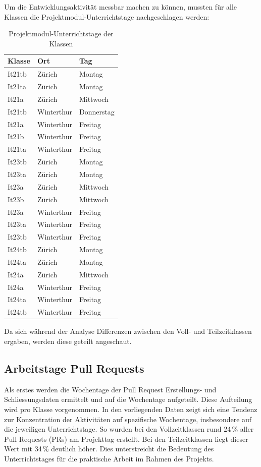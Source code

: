Um die Entwicklungsaktivität messbar machen zu können, mussten für alle Klassen die Projektmodul-Unterrichtstage nachgeschlagen werden:
\begin{table}[ht]
\caption{Projektmodul-Unterrichtstage der Klassen}
\label{tab:stundenplan}
\centering
\begin{tabular}{l l l}
\toprule
\textbf{Klasse} & \textbf{Ort} & \textbf{Tag} \\
\midrule
It21tb   & Zürich      & Montag      \\
It21ta   & Zürich      & Montag      \\
It21a    & Zürich      & Mittwoch    \\
It21tb   & Winterthur  & Donnerstag  \\
It21a    & Winterthur  & Freitag     \\
It21b    & Winterthur  & Freitag     \\
It21ta   & Winterthur  & Freitag     \\
\midrule
It23tb   & Zürich      & Montag      \\
It23ta   & Zürich      & Montag      \\
It23a    & Zürich      & Mittwoch    \\
It23b    & Zürich      & Mittwoch    \\
It23a    & Winterthur  & Freitag     \\
It23ta   & Winterthur  & Freitag     \\
It23tb   & Winterthur  & Freitag     \\
\midrule
It24tb   & Zürich      & Montag      \\
It24ta   & Zürich      & Montag      \\
It24a    & Zürich      & Mittwoch    \\
It24a    & Winterthur  & Freitag     \\
It24ta   & Winterthur  & Freitag     \\
It24tb   & Winterthur  & Freitag     \\
\bottomrule
\end{tabular}
\end{table}



Da sich während der Analyse  Differenzen zwischen den Voll- und Teilzeitklassen ergaben, werden diese geteilt angeschaut. 

\subsection{Arbeitstage Pull Requests}
Als erstes werden die Wochentage der Pull Request Erstellungs- und Schliessungsdaten ermittelt und auf die Wochentage aufgeteilt. Diese Aufteilung wird pro Klasse vorgenommen. In den vorliegenden Daten zeigt sich eine Tendenz zur Konzentration der Aktivitäten auf spezifische Wochentage, insbesondere auf die jeweiligen Unterrichtstage. So wurden bei den Vollzeitklassen rund 24\,\% aller Pull Requests (PRs) am Projekttag erstellt. Bei den Teilzeitklassen liegt dieser Wert mit 34\,\% deutlich höher. Dies unterstreicht die Bedeutung des Unterrichtstages für die praktische Arbeit im Rahmen des Projekts.

